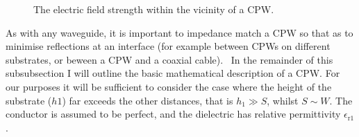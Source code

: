 \begin{figure}
  \caption{
    The  electric field strength within the vicinity of a CPW.
  }
  \label{experiment:fig:CPWfield}
\end{figure}

As with any waveguide, it is important to impedance match a CPW so that as to
minimise reflections at an interface (for example between CPWs on different
substrates, or beween a CPW and a coaxial cable).~\cite{Jackson1975} In the
remainder of this subsubsection I will outline the basic mathematical
description of a CPW. For our purposes it will be sufficient to consider the
case where the height of the substrate ($h1$) far exceeds the other distances,
that is $h_1 \gg S$, whilst $S \sim W$. The conductor is assumed to be perfect,
and the dielectric has relative permittivity $\epsilon_\mathrm{r1}$.

